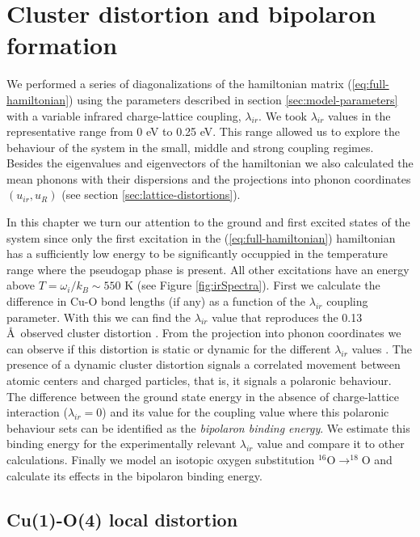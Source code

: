 \chapter{Cluster distortion and bipolaron formation}
\label{chap:ground}

We performed a series of diagonalizations of the hamiltonian matrix (\ref{eq:full-hamiltonian}) using the parameters described in section \ref{sec:model-parameters} with a variable infrared charge-lattice coupling, $\lambda_{ir}$. 
We took $\lambda_{ir}$ values in the representative range from 0 eV to 0.25 eV. 
This range allowed us to explore the behaviour of the system in the small, middle and strong coupling regimes. 
Besides the eigenvalues and eigenvectors of the hamiltonian we also calculated the mean phonons with their dispersions and the projections into phonon coordinates $(u_{ir}, u_R)$ (see section \ref{sec:lattice-distortions}).

In this chapter we turn our attention to the ground and first excited states of the system since only the first excitation in the (\ref{eq:full-hamiltonian}) hamiltonian has a sufficiently low energy to be significantly occuppied in the temperature range where the pseudogap phase is present.
All other excitations have an energy above $T=\omega_i/k_B \sim 550$ K (see Figure \ref{fig:irSpectra}).
First we calculate the difference in Cu-O bond lengths (if any) as a function of the $\lambda_{ir}$ coupling parameter.
With this we can find the $\lambda_{ir}$ value that reproduces the 0.13 \AA\ observed cluster distortion \cite{MustredeLeon1990}.
From the projection into phonon coordinates we can observe if this distortion is static or dynamic for the different $\lambda_{ir}$ values \cite{MustredeLeon1992}.
The presence of a dynamic cluster distortion signals a correlated movement between atomic centers and charged particles, that is, it signals a polaronic behaviour.
The difference between the ground state energy in the absence of charge-lattice interaction ($\lambda_{ir}=0$) and its value for the coupling value where this polaronic behaviour sets can be identified as the \textit{bipolaron binding energy}.
We estimate this binding energy for the experimentally relevant $\lambda_{ir}$ value and compare it to other calculations.
Finally we model an isotopic oxygen substitution $^{16}$O$\rightarrow ^{18}$O and calculate its effects in the bipolaron binding energy.

\section{Cu(1)-O(4) local distortion}
\label{sec:grd-phonon-proj}

